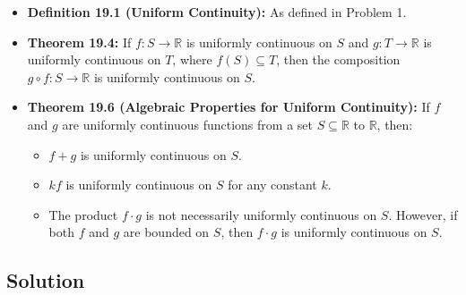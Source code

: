 \documentclass{article}
\newcommand{\R}{\mathbb{R}}
\begin{document}
\begin{itemize}
    \item \textbf{Definition 19.1 (Uniform Continuity):} As defined in Problem 1.
    \item \textbf{Theorem 19.4:} If \(f: S \to \R\) is uniformly continuous on \(S\) and \(g: T \to \R\) is uniformly continuous on \(T\), where \(f(S) \subseteq T\), then the composition \(g \circ f: S \to \R\) is uniformly continuous on \(S\).
    \item \textbf{Theorem 19.6 (Algebraic Properties for Uniform Continuity):} If \(f\) and \(g\) are uniformly continuous functions from a set \(S \subseteq \R\) to \(\R\), then:
        \begin{itemize}
            \item \(f+g\) is uniformly continuous on \(S\).
            \item \(kf\) is uniformly continuous on \(S\) for any constant \(k\).
            \item The product \(f \cdot g\) is not necessarily uniformly continuous on \(S\). However, if both \(f\) and \(g\) are bounded on \(S\), then \(f \cdot g\) is uniformly continuous on \(S\).
        \end{itemize}
\end{itemize}

\subsection*{Solution}
\end{document}
